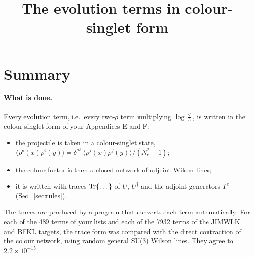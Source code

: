 \documentclass[10pt]{article}
\title{The evolution terms in colour-singlet form}
\date{}
\numberwithin{equation}{section}
\begin{document}
\maketitle
\tableofcontents

\section{Summary}\label{sec:summary}
\paragraph{What is done.} Every evolution term, i.e.\ every two-$\rho$ term multiplying $\log\frac{\vee}{\Lambda}$, is written in the colour-singlet form of your Appendices E and F:
\begin{itemize}
\item the projectile is taken in a colour-singlet state, $\langle\rho^a(x)\rho^b(y)\rangle=\delta^{ab}\,\langle\rho^f(x)\rho^f(y)\rangle/(N_c^2-1)$;
\item the colour factor is then a closed network of adjoint Wilson lines;
\item it is written with traces ${\rm Tr}\{\dots\}$ of $U$, $U^\dagger$ and the adjoint generators $T^e$ (Sec.~\ref{sec:rules}).
\end{itemize}
The traces are produced by a program that converts each term automatically. For each of the 489 terms of your lists and each of the 7932 terms of the JIMWLK and BFKL targets, the trace form was compared with the direct contraction of the colour network, using random general SU(3) Wilson lines. They agree to $2.2\times10^{-15}$.
\end{document}
